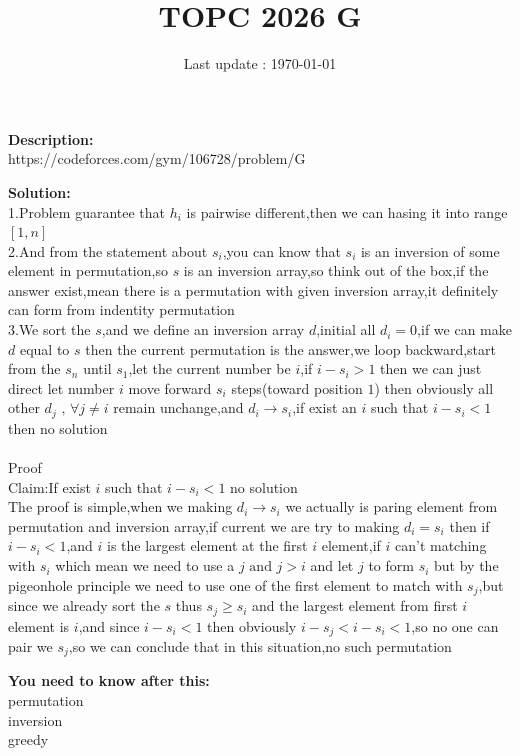 \documentclass{article}
\begin{document}
\title{\textbf{TOPC 2026 G}}
\author{}
\date{Last update : \today}

\maketitle

\noindent \textbf{Description:}\\
https://codeforces.com/gym/106728/problem/G

\noindent \textbf{Solution:}\\
1.Problem guarantee that $h_i$ is pairwise different,then we can hasing it into range $[1,n]$\\
2.And from the statement about $s_i$,you can know that $s_i$ is an inversion of some element in permutation,so $s$ is an inversion array,so think out of the box,if the answer exist,mean there is a permutation with given inversion array,it definitely can form from indentity permutation\\
3.We sort the $s$,and we define an inversion array $d$,initial all $d_i=0$,if we can make $d$ equal to $s$ then the current permutation is the answer,we loop backward,start from the $s_n$ until $s_1$,let the current number be $i$,if $i-s_i>1$ then we can just direct let number $i$ move forward $s_i$ steps(toward position $1$) then obviously all other $d_j\text{ , }\forall j\ne i$ remain unchange,and $d_i\rightarrow s_i$,if exist an $i$ such that $i-s_i<1$ then no solution\\
\\
Proof\\
Claim:If exist $i$ such that $i-s_i<1$ no solution\\
The proof is simple,when we making $d_i \rightarrow s_i$ we actually is paring element from permutation and inversion array,if current we are try to making $d_i=s_i$ then if $i-s_i<1$,and $i$ is the largest element at the first $i$ element,if $i$ can't matching with $s_i$ which mean we need to use a $j\text{ and }j>i$ and let $j$ to form $s_i$ but by the pigeonhole principle we need to use one of the first element to match with $s_j$,but since we already sort the $s$ thus $s_j\ge s_i$ and the largest element from first $i$ element is $i$,and since $i-s_i<1$ then obviously $i-s_j<i-s_i<1$,so no one can pair we $s_j$,so we can conclude that in this situation,no such permutation

\noindent \textbf{You need to know after this:}\\
permutation\\
inversion\\
greedy
\end{document}
